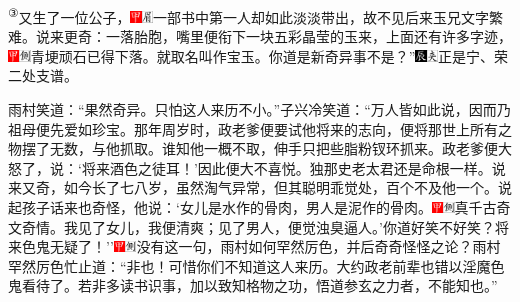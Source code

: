 {\textsuperscript{③}}又生了一位公子，{\includegraphics[width=3mm]{../Images/00002}\includegraphics[width=3mm]{../Images/00010}\footnotesize \kaishu 一部书中第一人却如此淡淡带出，故不见后来玉兄文字繁难。}说来更奇：一落胎胞，嘴里便衔下一块五彩晶莹的玉来，上面还有许多字迹，{\includegraphics[width=3mm]{../Images/00002}\includegraphics[width=3mm]{../Images/00011}\footnotesize \kaishu 青埂顽石已得下落。}就取名叫作宝玉。你道是新奇异事不是？''{\includegraphics[width=3mm]{../Images/00009}\includegraphics[width=3mm]{../Images/00012}\footnotesize \kaishu 正是宁、荣二处支谱。}

雨村笑道：``果然奇异。只怕这人来历不小。''子兴冷笑道：``万人皆如此说，因而乃祖母便先爱如珍宝。那年周岁时，政老爹便要试他将来的志向，便将那世上所有之物摆了无数，与他抓取。谁知他一概不取，伸手只把些脂粉钗环抓来。政老爹便大怒了，说：`将来酒色之徒耳！'因此便大不喜悦。独那史老太君还是命根一样。说来又奇，如今长了七八岁，虽然淘气异常，但其聪明乖觉处，百个不及他一个。说起孩子话来也奇怪，他说：`女儿是水作的骨肉，男人是泥作的骨肉。{\includegraphics[width=3mm]{../Images/00002}\includegraphics[width=3mm]{../Images/00011}\footnotesize \kaishu 真千古奇文奇情。}我见了女儿，我便清爽；见了男人，便觉浊臭逼人。'你道好笑不好笑？将来色鬼无疑了！''{\includegraphics[width=3mm]{../Images/00002}\includegraphics[width=3mm]{../Images/00011}\footnotesize \kaishu 没有这一句，雨村如何罕然厉色，并后奇奇怪怪之论？}雨村罕然厉色忙止道：``非也！可惜你们不知道这人来历。大约政老前辈也错以淫魔色鬼看待了。若非多读书识事，加以致知格物之功，悟道参玄之力者，不能知也。''

